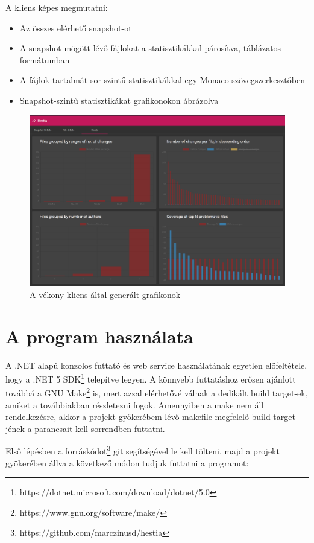 A kliens képes megmutatni:
\begin{itemize}
    \item Az összes elérhető snapshot-ot
    \item A snapshot mögött lévő fájlokat a statisztikákkal párosítva, táblázatos formátumban
    \item A fájlok tartalmát sor-szintű statisztikákkal egy Monaco szövegszerkesztőben
    \item Snapshot-szintű statisztikákat grafikonokon ábrázolva
\end{itemize}

\begin{figure}[H]
    \centering
    \includegraphics[width=1\textwidth]{images/hestia_charts.png}
    \caption{A vékony kliens által generált grafikonok}
    \label{fig:hestia-charts}
\end{figure}

\section{A program használata}

A .NET alapú konzolos futtató és web service használatának egyetlen előfeltétele, hogy a .NET 5 SDK\footnote{https://dotnet.microsoft.com/download/dotnet/5.0} telepítve legyen. A könnyebb futtatáshoz erősen ajánlott továbbá a GNU Make\footnote{https://www.gnu.org/software/make/} is, mert azzal elérhetővé válnak a dedikált build target-ek, amiket a továbbiakban részletezni fogok. Amennyiben a make nem áll rendelkezésre, akkor a projekt gyökerébem lévő makefile megfelelő build target-jének a parancsait kell sorrendben futtatni.

Első lépésben a forráskódot\footnote{https://github.com/marczinusd/hestia} git segítségével le kell tölteni, majd a projekt gyökerében állva a következő módon tudjuk futtatni a programot:


